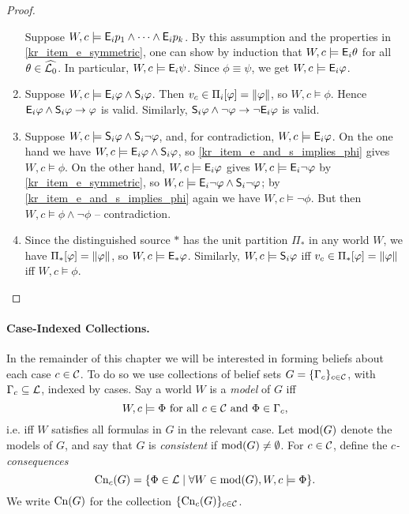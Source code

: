 \begin{proof}
\begin{enumerate}
        Suppose $W, c \models \E_i{p_1} \land \cdots \land \E_i{p_k}$. By this
        assumption and the properties in \cref{kr_item_e_symmetric},
        one can show by induction that $W, c \models \E_i{\theta}$ for all
        $\theta \in \widehat{\lprop}$. In particular, $W, c \models \E_i\psi$.
        Since $\phi \equiv \psi$, we get $W, c \models \E_i\phi$.

    \item
        Suppose $W, c \models \E_i\phi \land \S_i\phi$. Then $v_c \in
        \Pi_i[\phi] = \propmods{\phi}$, so $W, c \models \phi$. Hence
        $\E_i\phi \land \S_i\phi \limplies \phi$ is valid. Similarly,
        $\S_i\phi \land \neg\phi \limplies \neg \E_i\phi$ is valid.

    \item
        Suppose $W, c \models \S_i\phi \land \S_i\neg\phi$, and, for
        contradiction, $W, c \models \E_i\phi$. On the one hand we have $W, c
        \models \E_i\phi \land \S_i\phi$, so
        \cref{kr_item_e_and_s_implies_phi} gives $W, c \models \phi$. On
        the other hand, $W, c \models \E_i\phi$ gives $W, c \models
        \E_i\neg\phi$ by \cref{kr_item_e_symmetric}, so $W, c \models
        \E_i\neg\phi \land \S_i\neg\phi$; by
        \cref{kr_item_e_and_s_implies_phi} again we have $W, c \models
        \neg\phi$. But then $W, c \models \phi \land \neg\phi$ --
        contradiction.

    \item
        Since the distinguished source $\ast$ has the unit partition $\Pi_\ast$
        in any world $W$, we have $\Pi_\ast[\phi] = \propmods{\phi}$, so $W, c
        \models \E_\ast\phi$. Similarly, $W, c \models \S_i\phi$ iff $v_c \in
        \Pi_\ast[\phi] = \propmods{\phi}$ iff $W, c \models \phi$.
\end{enumerate}
\end{proof}

\paragraph{Case-Indexed Collections.}

In the remainder of this chapter we will be interested in forming beliefs about
each case $c \in \C$. To do so we use collections of belief
sets $G = \{\Gamma_c\}_{c \in \C}$, with $\Gamma_c \subseteq \lext$, indexed by
cases.
%
Say a world $W$ is a \emph{model} of $G$ iff
\[
    W, c \models \Phi \text{ for all } c \in \C \text{ and } \Phi \in \Gamma_c,
\]
i.e. iff $W$ satisfies all formulas in $G$ in the relevant case. Let
$\mods(G)$ denote the models of $G$, and say that $G$ is
\emph{consistent} if $\mods(G) \ne \emptyset$. For $c \in \C$, define the
\emph{$c$-consequences}
\[
    \cn_c(G) = \{\Phi \in \lext \mid \forall W \in \mods(G), W, c \models \Phi\}.
\]
We write $\cn(G)$
for the collection $\{\cn_c(G)\}_{c \in \C}$.

